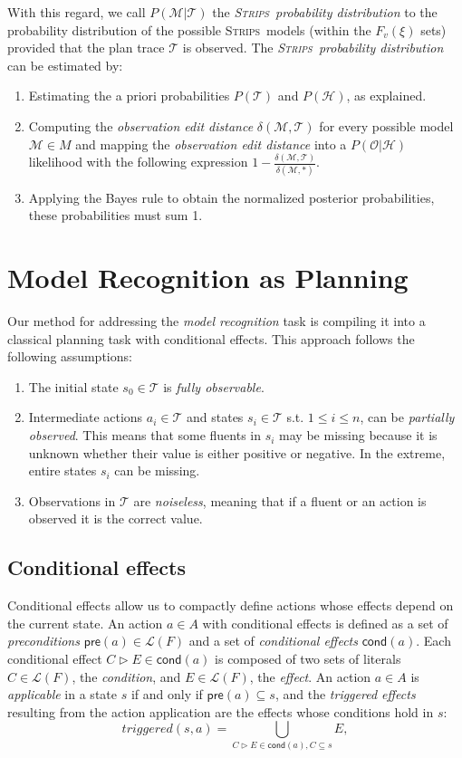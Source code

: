 \documentclass[letterpaper]{article} %
\newcommand{\pre}{\mathsf{pre}}     %
\newcommand{\cond}{\mathsf{cond}}   %
\newcommand{\strips}{\textsc{Strips}}     %
\begin{document}
With this regard, we call $P(\mathcal{M}|\mathcal{T})$ the {\em \strips\ probability distribution} to the probability distribution of the possible \strips\ models (within the $F_v(\xi)$ sets) provided that the plan trace $\mathcal{T}$ is observed. The {\em \strips\ probability distribution} can be estimated by:
\begin{enumerate}
\item Estimating the a priori probabilities $P(\mathcal{T})$ and $P(\mathcal{H})$, as explained.
\item Computing the {\em observation edit distance} $\delta(\mathcal{M},\mathcal{T})$ for every possible model $\mathcal{M}\in M$ and mapping the {\em observation edit distance} into a $P(\mathcal{O}|\mathcal{H})$ likelihood with the following expression $1-\frac{\delta(\mathcal{M},\mathcal{T})}{\delta(\mathcal{M},*)}$. 
\item Applying the Bayes rule to obtain the normalized posterior probabilities, these probabilities must sum 1.
\end{enumerate}



\section{Model Recognition as Planning}
\label{sec:asPlanning}
Our method for addressing the {\em model recognition} task is compiling it into a classical planning task with conditional effects. This approach follows the following assumptions:
\begin{enumerate}
\item The initial state $s_0\in\mathcal{T}$ is {\em fully observable}.
\item Intermediate actions $a_i\in\mathcal{T}$ and states $s_i\in\mathcal{T}$ s.t. {\small $1\leq i\leq n$}, can be {\em partially observed}. This means that some fluents in $s_i$ may be missing because it is unknown whether their value is either positive or negative. In the extreme, entire states $s_i$ can be missing. 
\item Observations in $\mathcal{T}$ are {\em noiseless}, meaning that if a fluent or an action is observed it is the correct value. 
\end{enumerate}


\subsection{Conditional effects}
Conditional effects allow us to compactly define actions whose effects depend on the current state. An action $a\in A$ with conditional effects is defined as a set of {\em preconditions} $\pre(a)\in\mathcal{L}(F)$ and a set of {\em conditional effects} $\cond(a)$. Each conditional effect $C\rhd E\in\cond(a)$ is composed of two sets of literals $C\in\mathcal{L}(F)$, the {\em condition}, and $E\in\mathcal{L}(F)$, the {\em effect}. An action $a\in A$ is {\em applicable} in a state $s$ if and only if $\pre(a)\subseteq s$, and the {\em triggered effects} resulting from the action application are the effects whose conditions hold in $s$:
\[
triggered(s,a)=\bigcup_{C\rhd E\in\cond(a),C\subseteq s} E,
\]
\end{document}

